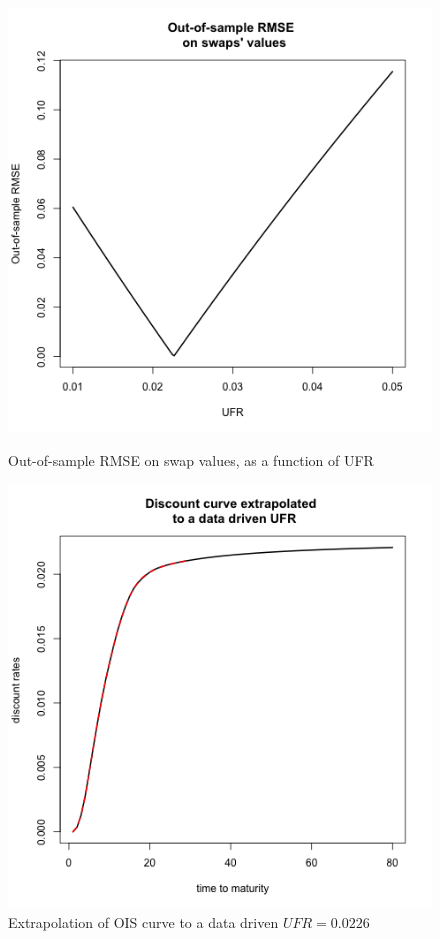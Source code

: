 \begin{figure}[!htb]
    \centering
    \begin{minipage}{.5\textwidth}
        \centering
        \includegraphics[width=1.06\linewidth, height=0.35\textheight]{gfx/chapter-yc-insurance/construction_graph20_1}
        \caption{Out-of-sample RMSE on swap values, as a function of UFR}
        \label{fig:datadrivenUFR1}
    \end{minipage}%
    \begin{minipage}{0.5\textwidth}
        \centering
        \includegraphics[width=1.06\linewidth, height=0.35\textheight]{gfx/chapter-yc-insurance/construction_graph20_2}
        \caption{Extrapolation of OIS curve to a data driven $UFR = 0.0226$}
        \label{fig:datadrivenUFR2}
    \end{minipage}
  \end{figure}
  
